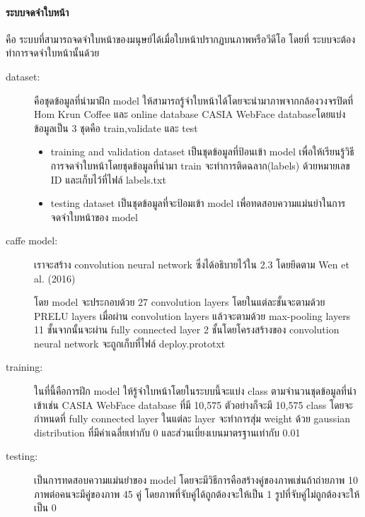 \paragraph{\textbf{ระบบจดจำใบหน้า}}
คือ ระบบที่สามารถจดจำใบหน้าของมนุษย์ได้เมื่อใบหน้าปรากฏบนภาพหรือวีดีโอ โดยที่ ระบบจะต้องทำการจดจำใบหน้านั้นด้วย
\begin{description}
\item[dataset:] คือชุดข้อมูลที่นำมาฝึก model ให้สามารถรู้จำใบหน้าได้โดยจะนำมาภาพจากกล้องวงจรปิดที่ Hom Krun Coffee และ online database CASIA WebFace databaseโดยแบ่งข้อมูลเป็น 3 ชุดคือ train,validate และ test
  
  \begin{itemize}
    \item training and validation dataset เป็นชุดข้อมูลที่ป้อนเข้า model เพื่อให้เรียนรู้วิธีการจดจำใบหน้าโดยชุดข้อมูลที่นำมา train จะทำการติดฉลาก(labels) ด้วยหมายเลข ID และเก็บไว้ที่ไฟล์ labels.txt

    \item testing dataset เป็นชุดข้อมูลที่จะป้อมเข้า model เพื่อทดสอบความแม่นยำในการจดจำใบหน้าของ model
  \end{itemize}
\item[caffe model:] เราจะสร้าง convolution neural network ซึ่งได้อธิบายไว้ใน 2.3 โดยยึดตาม Wen et al. (2016)

  โดย model จะประกอบด้วย 27 convolution layers โดยในแต่ละชั้นจะตามด้วย PRELU layers เมื่อผ่าน convolution layers แล้วจะตามด้วย max-pooling layers 11 ชั้นจากนั้นจะผ่าน fully connected layer 2 ชั้นโดยโครงสร้างของ convolution neural network จะถูกเก็บที่ไฟล์ deploy.prototxt

\item[training:] ในที่นี้คือการฝึก model ให้รู้จำใบหน้าโดยในระบบนี้จะแบ่ง class ตามจำนวนชุดข้อมูลที่นำเข้าเช่น CASIA WebFace database ที่มี 10,575 ตัวอย่างก็จะมี 10,575 class โดยจะกำหนดที่ fully connected layer ในแต่ละ layer จะทำการสุ่ม weight ด้วย gaussian distribution ที่มีค่าเฉลี่ยเท่ากับ 0 และส่วนเบี่ยงเบนมาตรฐานเท่ากับ 0.01

\item[testing:] เป็นการทดสอบความแม่นยำของ model โดยจะมีวิธีการคือสร้างคู่ของภาพเช่นถ้าถ่ายภาพ 10 ภาพต่อคนจะมีคู่ของภาพ 45 คู่ โดยภาพที่จับคู่ได้ถูกต้องจะให้เป็น 1 รูปที่จับคู่ไม่ถูกต้องจะให้เป็น 0
\end{description}

